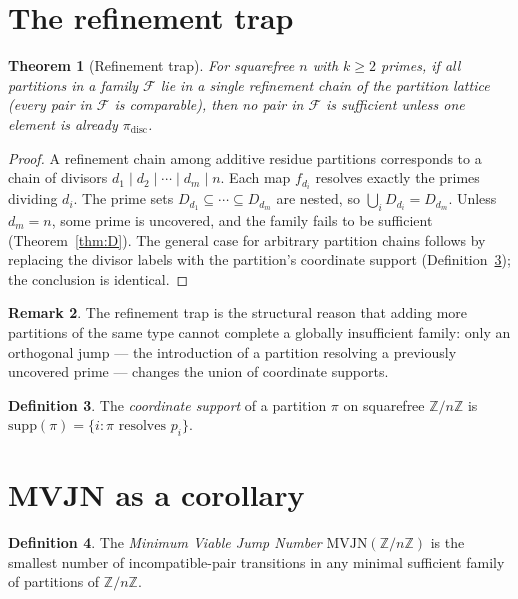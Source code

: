 \documentclass[11pt,reqno]{amsart}
\theoremstyle{plain}
\newtheorem{theorem}{Theorem}
\theoremstyle{definition}
\newtheorem{definition}[theorem]{Definition}
\newtheorem{remark}[theorem]{Remark}
\newcommand{\Z}{\mathbb{Z}}
\newcommand{\Zn}{\Z/n\Z}
\newcommand{\disc}{\mathrm{disc}}
\newcommand{\supp}{\mathrm{supp}}
\begin{document}
\section{The refinement trap} \label{sec:rt}

\begin{theorem}[Refinement trap] \label{thm:RT}
For squarefree $n$ with $k \geq 2$ primes, if all partitions in a family $\mathcal F$ lie in a single refinement chain of the partition lattice (every pair in $\mathcal F$ is comparable), then no pair in $\mathcal F$ is sufficient unless one element is already $\pi_{\disc}$.
\end{theorem}

\begin{proof}
A refinement chain among additive residue partitions corresponds to a chain of divisors $d_1 \mid d_2 \mid \cdots \mid d_m \mid n$. Each map $f_{d_i}$ resolves exactly the primes dividing $d_i$. The prime sets $D_{d_1} \subseteq \cdots \subseteq D_{d_m}$ are nested, so $\bigcup_i D_{d_i} = D_{d_m}$. Unless $d_m = n$, some prime is uncovered, and the family fails to be sufficient (Theorem~\ref{thm:D}). The general case for arbitrary partition chains follows by replacing the divisor labels with the partition's coordinate support (Definition~\ref{def:supp}); the conclusion is identical.
\end{proof}

\begin{remark}
The refinement trap is the structural reason that adding more partitions of the same type cannot complete a globally insufficient family: only an orthogonal jump --- the introduction of a partition resolving a previously uncovered prime --- changes the union of coordinate supports.
\end{remark}

\begin{definition} \label{def:supp}
The \emph{coordinate support} of a partition $\pi$ on squarefree $\Zn$ is $\supp(\pi) = \{i : \pi \text{ resolves } p_i\}$.
\end{definition}

\section{MVJN as a corollary} \label{sec:mvjn}

\begin{definition}
The \emph{Minimum Viable Jump Number} $\mathrm{MVJN}(\Zn)$ is the smallest number of incompatible-pair transitions in any minimal sufficient family of partitions of $\Zn$.
\end{definition}
\end{document}
